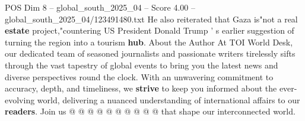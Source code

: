 \begin{textsample}{POS Dim 8 – global\_south\_2025\_04 – Score 4.00 – global\_south\_2025\_04/123491480.txt}
He also reiterated that Gaza is"not a real \textbf{estate} project,"countering US President Donald Trump ' s earlier suggestion of turning the region into a tourism \textbf{hub}.
About the Author At TOI World Desk, our dedicated team of seasoned journalists and passionate writers tirelessly sifts through the vast tapestry of global events to bring you the latest news and diverse perspectives round the clock.
With an unwavering commitment to accuracy, depth, and timeliness, we \textbf{strive} to keep you informed about the ever-evolving world, delivering a nuanced understanding of international affairs to our \textbf{readers}.
Join us @ @ @ @ @ @ @ @ @ @ that shape our interconnected world.

\end{textsample}
